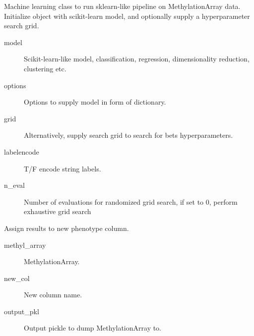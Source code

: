 \documentclass[letterpaper,10pt,english]{sphinxmanual}
\begin{document}
\begin{fulllineitems}
\label{\detokenize{index:pymethylprocess.general_machine_learning.MachineLearning}}
Machine learning class to run sklearn-like pipeline on MethylationArray data.
Initialize object with scikit-learn model, and optionally supply a hyperparameter search grid.
\begin{description}
\item[{model}] \leavevmode
Scikit-learn-like model, classification, regression, dimensionality reduction, clustering etc.

\item[{options}] \leavevmode
Options to supply model in form of dictionary.

\item[{grid}] \leavevmode
Alternatively, supply search grid to search for bets hyperparameters.

\item[{labelencode}] \leavevmode
T/F encode string labels.

\item[{n\_eval}] \leavevmode
Number of evaluations for randomized grid search, if set to 0, perform exhaustive grid search

\end{description}

\begin{fulllineitems}
\label{\detokenize{index:pymethylprocess.general_machine_learning.MachineLearning.assign_results_to_pheno_col}}
Assign results to new phenotype column.
\begin{description}
\item[{methyl\_array}] \leavevmode
MethylationArray.

\item[{new\_col}] \leavevmode
New column name.

\item[{output\_pkl}] \leavevmode
Output pickle to dump MethylationArray to.


\end{description}
\end{fulllineitems}
\end{fulllineitems}
\end{document}
